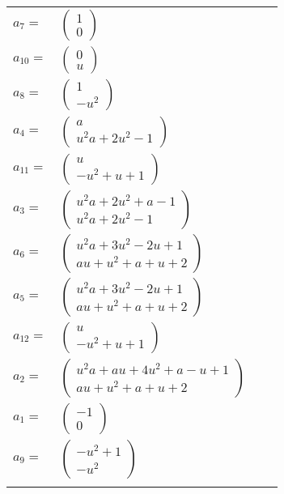 \documentclass[1p]{elsarticle_modified}
\theoremstyle{definition}
\begin{document}
\begin{tabular}{m{7pt} m{180pt} m{7pt} m{180pt} }
\flushright $a_{7}=$&$\begin{pmatrix}1\\0\end{pmatrix}$ \\
\flushright $a_{10}=$&$\begin{pmatrix}0\\u\end{pmatrix}$ \\
\flushright $a_{8}=$&$\begin{pmatrix}1\\- u^2\end{pmatrix}$ \\
\flushright $a_{4}=$&$\begin{pmatrix}a\\u^2 a+2 u^2-1\end{pmatrix}$ \\
\flushright $a_{11}=$&$\begin{pmatrix}u\\- u^2+u+1\end{pmatrix}$ \\
\flushright $a_{3}=$&$\begin{pmatrix}u^2 a+2 u^2+a-1\\u^2 a+2 u^2-1\end{pmatrix}$ \\
\flushright $a_{6}=$&$\begin{pmatrix}u^2 a+3 u^2-2 u+1\\a u+u^2+a+u+2\end{pmatrix}$ \\
\flushright $a_{5}=$&$\begin{pmatrix}u^2 a+3 u^2-2 u+1\\a u+u^2+a+u+2\end{pmatrix}$ \\
\flushright $a_{12}=$&$\begin{pmatrix}u\\- u^2+u+1\end{pmatrix}$ \\
\flushright $a_{2}=$&$\begin{pmatrix}u^2 a+a u+4 u^2+a- u+1\\a u+u^2+a+u+2\end{pmatrix}$ \\
\flushright $a_{1}=$&$\begin{pmatrix}-1\\0\end{pmatrix}$ \\
\flushright $a_{9}=$&$\begin{pmatrix}- u^2+1\\- u^2\end{pmatrix}$\\&\end{tabular}
\end{document}
